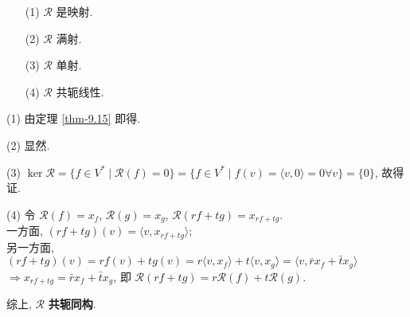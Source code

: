 \documentclass{note}
\begin{document}
\begin{itemize}
    \item[(1)] $\mathcal{R}$ 是映射.
    \item[(2)] $\mathcal{R}$ 满射.
    \item[(3)] $\mathcal{R}$ 单射.
    \item[(4)] $\mathcal{R}$ 共轭线性.
\end{itemize}
\begin{pf}
    \item[(1)] 由定理 \ref{thm-9.15} 即得.
    \item[(2)] 显然.
    \item[(3)] $\ker\mathcal{R}=\{f\in V^*\mid\mathcal{R}(f)=0\}=\{f\in V^*\mid f(v)=\langle v,0\rangle=0\forall v\}=\{0\}$, 故得证.
    \item[(4)] 令 $\mathcal{R}(f)=x_f$, $\mathcal{R}(g)=x_g$, $\mathcal{R}(rf+tg)=x_{rf+tg}$.\\
    一方面, $(rf+tg)(v)=\langle v,x_{rf+tg}\rangle$;\\
    另一方面, $(rf+tg)(v)=rf(v)+tg(v)=r\langle v,x_f\rangle+t\langle v,x_g\rangle=\langle v,\bar{r}x_f+\bar{t}x_g\rangle$\\
    $\Longrightarrow x_{rf+tg}=\bar{r}x_f+\bar{t}x_g$, 即 $\mathcal{R}(rf+tg)=r\mathcal{R}(f)+t\mathcal{R}(g)$.
\end{pf}
综上, $\mathcal{R}$ \textbf{共轭同构}.
\ifx\allfiles\undefined
\end{document}
